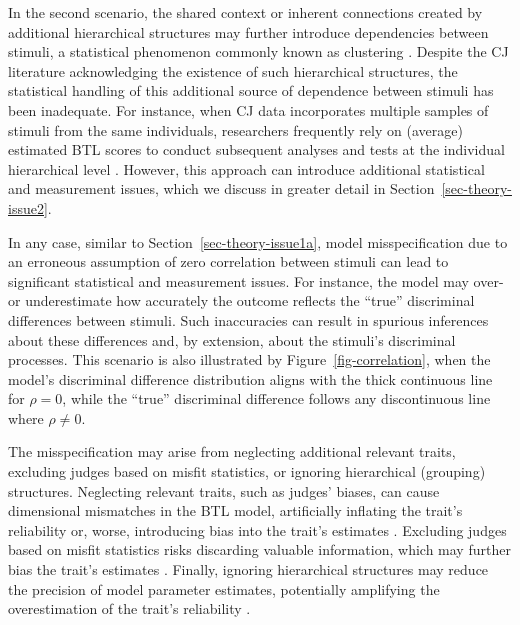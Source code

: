 \documentclass[
  authoryear,
  review,
  1p]{elsarticle}
\begin{document}
In the second scenario, the shared context or inherent connections
created by additional hierarchical structures may further introduce
dependencies between stimuli, a statistical phenomenon commonly known as
clustering \citep{Everitt_et_al_2010}. Despite the CJ literature
acknowledging the existence of such hierarchical structures, the
statistical handling of this additional source of dependence between
stimuli has been inadequate. For instance, when CJ data incorporates
multiple samples of stimuli from the same individuals, researchers
frequently rely on (average) estimated BTL scores to conduct subsequent
analyses and tests at the individual hierarchical level
\citep{Bramley_et_al_2019, Boonen_et_al_2020, Bouwer_et_al_2023, vanDaal_et_al_2017, Jones_et_al_2019, Gijsen_et_al_2021}.
However, this approach can introduce additional statistical and
measurement issues, which we discuss in greater detail in
Section~\ref{sec-theory-issue2}.

In any case, similar to Section~\ref{sec-theory-issue1a}, model
misspecification due to an erroneous assumption of zero correlation
between stimuli can lead to significant statistical and measurement
issues. For instance, the model may over- or underestimate how
accurately the outcome reflects the ``true'' discriminal differences
between stimuli. Such inaccuracies can result in spurious inferences
about these differences and, by extension, about the stimuli's
discriminal processes. This scenario is also illustrated by
Figure~\ref{fig-correlation}, when the model's discriminal difference
distribution aligns with the thick continuous line for \(\rho=0\), while
the ``true'' discriminal difference follows any discontinuous line where
\(\rho \neq 0\).

The misspecification may arise from neglecting additional relevant
traits, excluding judges based on misfit statistics, or ignoring
hierarchical (grouping) structures. Neglecting relevant traits, such as
judges' biases, can cause dimensional mismatches in the BTL model,
artificially inflating the trait's reliability
\citep[pp.~341]{Hoyle_et_al_2023} or, worse, introducing bias into the
trait's estimates \citep{Ackerman_1989}. Excluding judges based on
misfit statistics risks discarding valuable information, which may
further bias the trait's estimates
\citep[chap.~12]{Zimmerman_1994, McElreath_2020}. Finally, ignoring
hierarchical structures may reduce the precision of model parameter
estimates, potentially amplifying the overestimation of the trait's
reliability \citep[pp.~482]{Hoyle_et_al_2023}.
\end{document}
